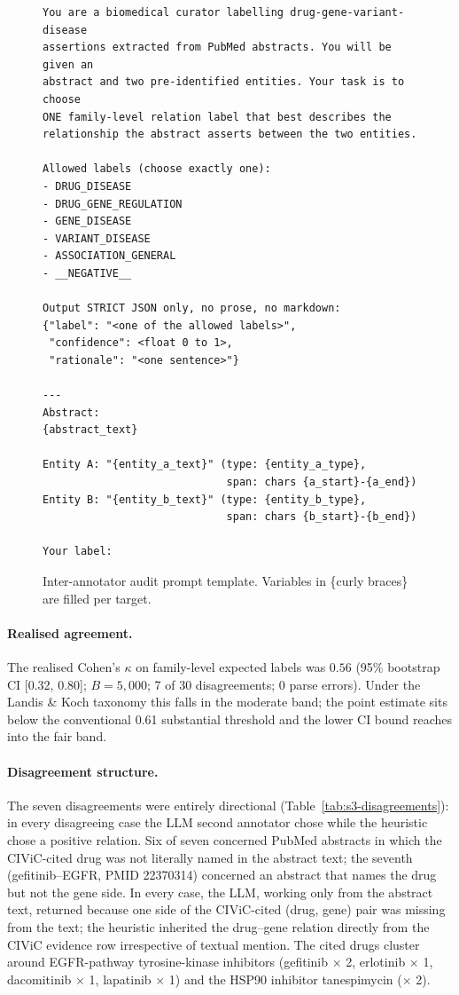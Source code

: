 \begin{figure}[H]
\caption{Inter-annotator audit prompt template. Variables in
\{curly braces\} are filled per target.}
\label{lst:iaa-prompt}
\small
\begin{verbatim}
You are a biomedical curator labelling drug-gene-variant-disease
assertions extracted from PubMed abstracts. You will be given an
abstract and two pre-identified entities. Your task is to choose
ONE family-level relation label that best describes the
relationship the abstract asserts between the two entities.

Allowed labels (choose exactly one):
- DRUG_DISEASE
- DRUG_GENE_REGULATION
- GENE_DISEASE
- VARIANT_DISEASE
- ASSOCIATION_GENERAL
- __NEGATIVE__

Output STRICT JSON only, no prose, no markdown:
{"label": "<one of the allowed labels>",
 "confidence": <float 0 to 1>,
 "rationale": "<one sentence>"}

---
Abstract:
{abstract_text}

Entity A: "{entity_a_text}" (type: {entity_a_type},
                             span: chars {a_start}-{a_end})
Entity B: "{entity_b_text}" (type: {entity_b_type},
                             span: chars {b_start}-{b_end})

Your label:
\end{verbatim}
\end{figure}

\paragraph{Realised agreement.}
The realised Cohen's \(\kappa\) on family-level expected labels was
\(0.56\) (95\% bootstrap CI [0.32, 0.80]; \(B = 5{,}000\); 7 of 30
disagreements; 0 parse errors). Under the Landis \& Koch taxonomy
\citep{landiskoch1977} this falls in the moderate band; the point
estimate sits below the conventional 0.61 substantial threshold and
the lower CI bound reaches into the fair band.

\paragraph{Disagreement structure.}
The seven disagreements were entirely directional
(Table~\ref{tab:s3-disagreements}): in every disagreeing case the
LLM second annotator chose  while the
heuristic chose a positive relation. Six of seven concerned PubMed
abstracts in which the CIViC-cited drug was not literally named in
the abstract text; the seventh (gefitinib--EGFR, PMID 22370314)
concerned an abstract that names the drug but not the gene side. In
every case, the LLM, working only from the abstract text, returned
 because one side of the CIViC-cited
(drug, gene) pair was missing from the text; the heuristic
inherited the drug--gene relation directly from the CIViC evidence
row irrespective of textual mention. The cited drugs cluster around
EGFR-pathway tyrosine-kinase inhibitors (gefitinib $\times$ 2,
erlotinib $\times$ 1, dacomitinib $\times$ 1, lapatinib $\times$ 1)
and the HSP90 inhibitor tanespimycin ($\times$ 2).

